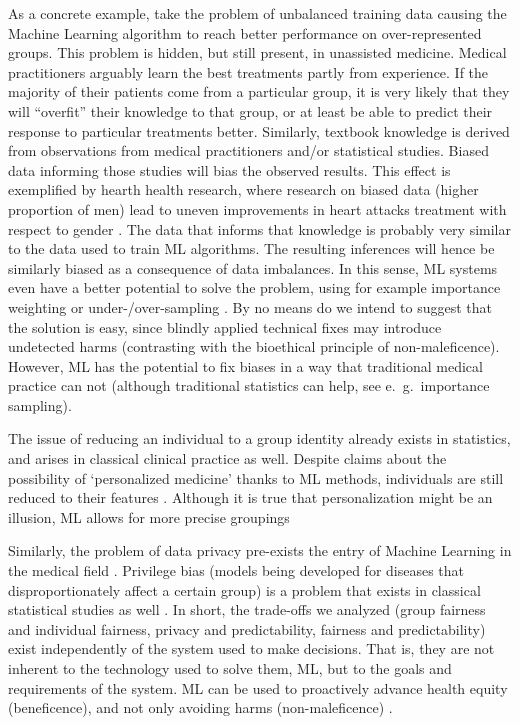    As a concrete example, take the problem of unbalanced training data causing the Machine Learning algorithm to reach better performance on over-represented groups.
    This problem is hidden, but still present, in unassisted medicine.
    Medical practitioners arguably learn the best treatments partly from experience.
    If the majority of their patients come from a particular group, it is very likely that they will ``overfit'' their knowledge to that group, or at least be able to predict their response to particular treatments better.
    Similarly, textbook knowledge is derived from observations from medical practitioners and/or statistical studies.
    Biased data informing those studies will bias the observed results.
    This effect is exemplified by hearth health research, where research on biased data (higher proportion of men) lead to uneven improvements in heart attacks treatment with respect to gender \cite[e221]{Mccradden2020}.
    The data that informs that knowledge is probably very similar to the data used to train ML algorithms.
    The resulting inferences will hence be similarly biased as a consequence of data imbalances.
    In this sense, ML systems even have a better potential to solve the problem, using for example importance weighting or under-/over-sampling \cite[pp.~6-8]{Chen2021}.
    By no means do we intend to suggest that the solution is easy, since blindly applied technical fixes may introduce undetected harms (contrasting with the bioethical principle of non-maleficence).
    However, ML has the potential to fix biases in a way that traditional medical practice can not \cite[p.~e222]{Mccradden2020} (although traditional statistics can help, see e.~g.~importance sampling).

    The issue of reducing an individual to a group identity already exists in statistics, and arises in classical clinical practice as well.
    Despite claims about the possibility of `personalized medicine' thanks to ML methods, individuals are still reduced to their features \cite{Dijkstra2020}.
    Although it is true that personalization might be an illusion, ML allows for more precise groupings

    Similarly, the problem of data privacy pre-exists the entry of Machine Learning in the medical field \cite[p.~346]{Dijkstra2020}.
    Privilege bias (models being developed for diseases that disproportionately affect a certain group) \cite[p.~5]{Rajkomar2018} is a problem that exists in classical statistical studies as well \cite{Jackson2019}.
    In short, the trade-offs we analyzed (group fairness and individual fairness, privacy and predictability, fairness and predictability) exist independently of the system used to make decisions.
    That is, they are not inherent to the technology used to solve them, ML, but to the goals and requirements of the system.
    ML can be used to proactively advance health equity (beneficence), and not only avoiding harms (non-maleficence) \cite[p.~2]{Rajkomar2018}.



